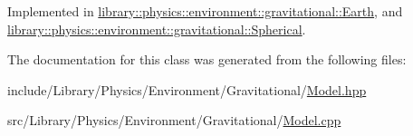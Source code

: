 Implemented in \hyperlink{classlibrary_1_1physics_1_1environment_1_1gravitational_1_1_earth_a493e78b74deb178fcbed8eff70adb390}{library\+::physics\+::environment\+::gravitational\+::\+Earth}, and \hyperlink{classlibrary_1_1physics_1_1environment_1_1gravitational_1_1_spherical_ae33a94d691c7fa1aea5bfc629fd3fb9f}{library\+::physics\+::environment\+::gravitational\+::\+Spherical}.



The documentation for this class was generated from the following files\+:\begin{DoxyCompactItemize}
\item 
include/\+Library/\+Physics/\+Environment/\+Gravitational/\hyperlink{_gravitational_2_model_8hpp}{Model.\+hpp}\item 
src/\+Library/\+Physics/\+Environment/\+Gravitational/\hyperlink{_gravitational_2_model_8cpp}{Model.\+cpp}\end{DoxyCompactItemize}

